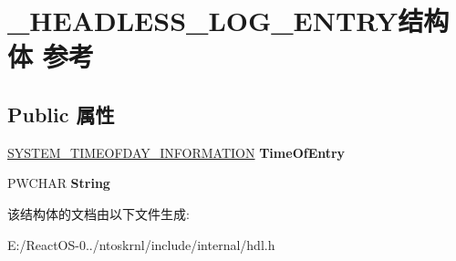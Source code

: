 \hypertarget{struct___h_e_a_d_l_e_s_s___l_o_g___e_n_t_r_y}{}\section{\+\_\+\+H\+E\+A\+D\+L\+E\+S\+S\+\_\+\+L\+O\+G\+\_\+\+E\+N\+T\+R\+Y结构体 参考}
\label{struct___h_e_a_d_l_e_s_s___l_o_g___e_n_t_r_y}
\subsection*{Public 属性}
\begin{DoxyCompactItemize}
\item 
\mbox{\label{struct___h_e_a_d_l_e_s_s___l_o_g___e_n_t_r_y_aee3e0823c0dc39f52eff85257df600ad}} 
\hyperlink{struct___s_y_s_t_e_m___t_i_m_e_o_f_d_a_y___i_n_f_o_r_m_a_t_i_o_n}{S\+Y\+S\+T\+E\+M\+\_\+\+T\+I\+M\+E\+O\+F\+D\+A\+Y\+\_\+\+I\+N\+F\+O\+R\+M\+A\+T\+I\+ON} {\bfseries Time\+Of\+Entry}
\item 
\mbox{\label{struct___h_e_a_d_l_e_s_s___l_o_g___e_n_t_r_y_af71c6c90fe2287e6b8ea00e5f97d04cc}} 
P\+W\+C\+H\+AR {\bfseries String}
\end{DoxyCompactItemize}


该结构体的文档由以下文件生成\+:\begin{DoxyCompactItemize}
\item 
E\+:/\+React\+O\+S-\/0../ntoskrnl/include/internal/hdl.\+h\end{DoxyCompactItemize}
